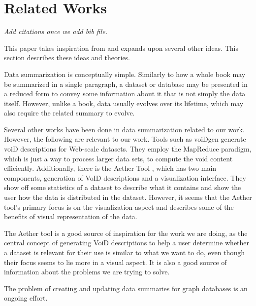 \section{Related Works}\label{sec:related-works}
\emph{Add citations once we add bib file.}

This paper takes inspiration from and expands upon several other ideas. This section describes these ideas and theories.

Data summarization is conceptually simple. Similarly to how a whole book may be summarized in a single paragraph, a dataset or database may be presented in a reduced form to convey some information about it that is not simply the data itself. However, unlike a book, data usually evolves over its lifetime, which may also require the related summary to evolve.

Several other works have been done in data summarization related to our work. However, the following are relevant to our work. Tools such as voiDgen\cite{creating-void-descriptions} generate voiD descriptions for Web-scale datasets. They employ the MapReduce paradigm, which is just a way to process larger data sets\cite{map-reduce-paradigm}, to compute the void content efficiently.
Additionally, there is the Aether Tool \cite{aether-tool}, which has two main components, generation of VoID descriptions and a visualization interface. They show off some statistics of a dataset to describe what it contains and show the user how the data is distributed in the dataset. However, it seems that the Aether tool's primary focus is on the visualization aspect and describes some of the benefits of visual representation of the data. 

The Aether tool is a good source of inspiration for the work we are doing, as the central concept of generating VoiD descriptions to help a user determine whether a dataset is relevant for their use is similar to what we want to do, even though their focus seems to lie more in a visual aspect. It is also a good source of information about the problems we are trying to solve. 

The problem of creating and updating data summaries for graph databases is an ongoing effort.


